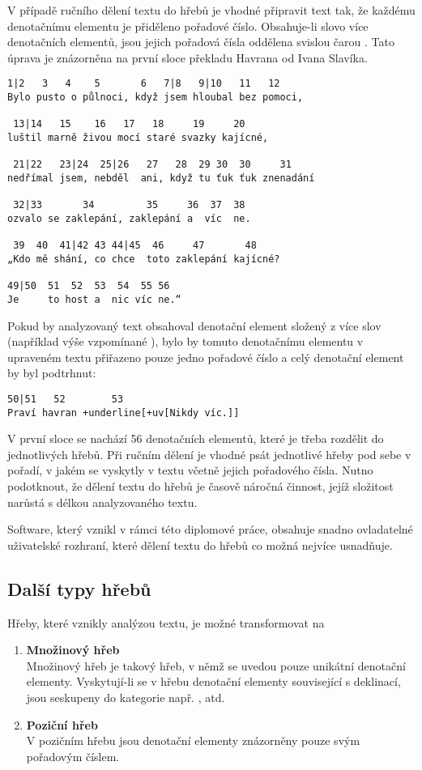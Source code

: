 V případě ručního dělení textu do hřebů je vhodné připravit text tak, že každému denotačnímu elementu je přiděleno pořadové číslo. Obsahuje-li slovo více denotačních elementů, jsou jejich pořadová čísla oddělena svislou čarou \uv{|}. Tato úprava je znázorněna na první sloce překladu Havrana od Ivana Slavíka.

\begin{samepage}
\begin{Verbatim}[commandchars=+\[\]]
 1|2   3   4    5       6   7|8   9|10   11   12
Bylo pusto o půlnoci, když jsem hloubal bez pomoci,

 13|14   15    16   17   18     19     20
luštil marně živou mocí staré svazky kajícné,

 21|22   23|24  25|26   27   28  29 30  30     31
nedřímal jsem, nebděl  ani, když tu ťuk ťuk znenadání

 32|33       34         35     36  37  38
ozvalo se zaklepání, zaklepání a  víc  ne.

 39  40  41|42 43 44|45  46     47       48
„Kdo mě shání, co chce  toto zaklepání kajícné?

49|50  51  52  53  54  55 56
Je     to host a  nic víc ne.“
\end{Verbatim}
\end{samepage}

Pokud by analyzovaný text obsahoval denotační element složený z více slov (například výše vzpomínané ), bylo by tomuto denotačnímu elementu v upraveném textu přiřazeno pouze jedno pořadové číslo a celý denotační element by byl podtrhnut:
\begin{Verbatim}[commandchars=+\[\]]
50|51   52        53
Praví havran +underline[+uv[Nikdy víc.]]
\end{Verbatim}

V první sloce se nachází 56 denotačních elementů, které je třeba rozdělit do jednotlivých hřebů. Při ručním dělení je vhodné psát jednotlivé hřeby pod sebe v pořadí, v jakém se vyskytly v textu včetně jejich pořadového čísla. Nutno podotknout, že dělení textu do hřebů je časově náročná činnost, jejíž složitost narůstá s délkou analyzovaného textu.

Software, který vznikl v rámci této diplomové práce, obsahuje snadno ovladatelné uživatelské rozhraní, které dělení textu do hřebů co možná nejvíce usnadňuje.

\subsection{Další typy hřebů}
Hřeby, které vznikly analýzou textu, je možné transformovat na
\begin{enumerate}
\item \textbf{Množinový hřeb}\\
Množinový hřeb je takový hřeb, v němž se uvedou pouze unikátní denotační elementy. Vyskytují-li se v hřebu denotační elementy související s deklinací, jsou seskupeny do kategorie např. ,  atd.
\item \textbf{Poziční hřeb}\\
V pozičním hřebu jsou denotační elementy znázorněny pouze svým pořadovým číslem.
\end{enumerate}

